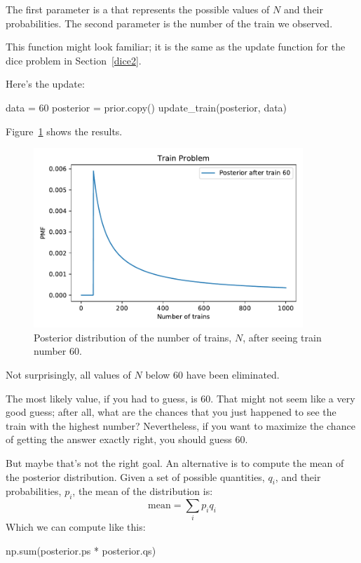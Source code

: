 \documentclass[12pt]{book}
\theoremstyle{exercise}
\begin{document}
The first parameter is a  that represents the possible values of $N$ and their probabilities.
The second parameter is the number of the train we observed.

This function might look familiar; it is the same as the update function for the dice problem in Section~\ref{dice2}.


Here's the update:

\begin{code}
data = 60
posterior = prior.copy()
update_train(posterior, data)
\end{code}

Figure~\ref{fig04-01} shows the results.
 
\begin{figure}
\centerline{\includegraphics[width=4in]{figs/fig04-01.pdf}}
\caption{Posterior distribution of the number of trains, $N$, after seeing train number 60.}
\label{fig04-01}
\end{figure}

Not surprisingly, all
values of $N$ below 60 have been eliminated.

The most likely value, if you had to guess, is 60.  
That might not seem like a very good guess; after all, what are the chances that you just happened to see the train with the highest number?
Nevertheless, if you want to maximize the chance of getting
the answer exactly right, you should guess 60.

But maybe that's not the right goal.  
An alternative is to compute the mean of the posterior distribution.
Given a set of possible quantities, $q_i$, and their probabilities, $p_i$, the mean of the distribution is:
%
\[ \mathrm{mean} = \sum_i p_i q_i \]
%
Which we can compute like this:

\begin{code}
np.sum(posterior.ps * posterior.qs)
\end{code}
\end{document}
